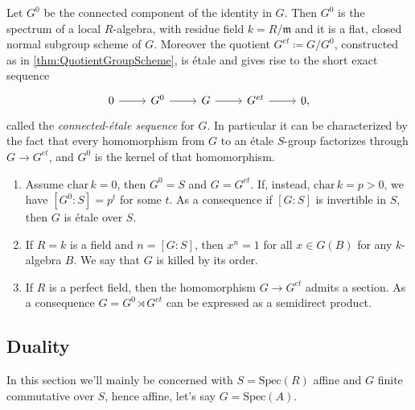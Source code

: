 \documentclass[../Main]{subfiles}
\begin{document}
\begin{thm}\label{thm:ConnecteEtaleSequenceGS}
	Let $G^0$ be the connected component of the identity in $G$.
	Then $G^0$ is the spectrum of a local $R$-algebra, with residue field $k = R/\mathfrak{m}$
	and it is a flat, closed normal subgroup scheme of $G$.
	Moreover the quotient $G^{et} \coloneqq G/G^0$,
	constructed as in \cref{thm:QuotientGroupScheme},
	is étale and gives rise to the short exact sequence
	\begin{equation*}
	\begin{tikzcd}
		0 \arrow[r, "", rightarrow] &
		G^0 \arrow[r, "", rightarrow] &
		G \arrow[r, "", rightarrow] &
		G^{et} \arrow[r, "", rightarrow] &
		0
	,\end{tikzcd}
	\end{equation*}
	called the {\em connected-étale sequence} for $G$.
	In particular it can be characterized by the fact that every homomorphism
	from $G$ to an étale $S$-group factorizes through $G \to G^{et}$,
	and $G^0$ is the kernel of that homomorphism.
\end{thm}


\begin{prop}\leavevmode\vspace{-.2\baselineskip}
\begin{enumerate}
	\item Assume $\mathrm{char}\, k = 0$, then $G^0 = S$
		and $G = G^{et}$.
		If, instead, $\mathrm{char}\, k = p > 0$, we have
		$[G^0:S] = p^t$ for some $t$.
		As a consequence if $[G:S]$ is invertible in $S$, then
		$G$ is étale over $S$.

	\item If $R = k$ is a field and $n = [G:S]$, then $x^n = 1$
		for all $x \in G(B)$ for any $k$-algebra $B$.
		We say that $G$ is killed by its order.

	\item If $R$ is a perfect field, then the homomorphism
		$G \to  G^{et}$ admits a section. 
		As a consequence $G = G^0 \rtimes G^{et}$
		can be expressed as a semidirect product.
\end{enumerate}
\end{prop}


\subsection{Duality}
In this section we'll mainly be concerned with $S = \mathrm{Spec}(R)$ affine
and $G$ finite commutative over $S$, hence affine, let's say $G = \mathrm{Spec}(A)$.
\end{document}

